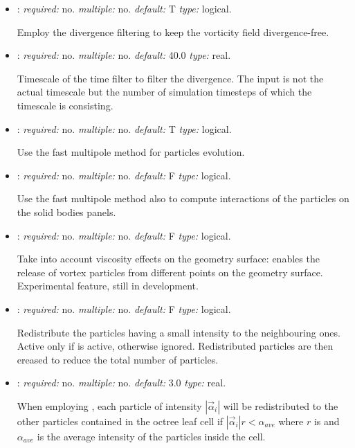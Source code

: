 \begin{itemize}
\item {}: \textit{required:} no. \textit{multiple:} no. \textit{default:} T \textit{type:} logical.

Employ the divergence filtering to keep the vorticity field divergence-free. 

\item {}: \textit{required:} no. \textit{multiple:} no. \textit{default:} 40.0 \textit{type:} real.

Timescale of the time filter to filter the divergence. The input is not the actual timescale but the number of simulation timesteps of which the timescale is consisting. 

\item {}: \textit{required:} no. \textit{multiple:} no. \textit{default:} T \textit{type:} logical.

Use the fast multipole method for particles evolution.

\item {}: \textit{required:} no. \textit{multiple:} no. \textit{default:} F \textit{type:} logical.

Use the fast multipole method also to compute interactions of the particles on the solid bodies panels.

\item {}: \textit{required:} no. \textit{multiple:} no. \textit{default:} F \textit{type:} logical.

Take into account viscosity effects on the geometry surface: enables the release of vortex particles from different points on the geometry surface. Experimental feature, still in development.

\item {}: \textit{required:} no. \textit{multiple:} no. \textit{default:} F \textit{type:} logical.

Redistribute the particles having a small intensity to the neighbouring ones. Active only if  is active, otherwise ignored. Redistributed particles are then ereased to reduce the total number of particles.

\item {}: \textit{required:} no. \textit{multiple:} no. \textit{default:} 3.0 \textit{type:} real.

When employing , each particle of intensity $|\vec{\alpha}_i|$ will be redistributed to the other particles contained in the octree leaf cell if $|\vec{\alpha}_i| r < \alpha_{ave}$ where $r$ is  and $\alpha_{ave}$ is the average intensity of the particles inside the cell.


\end{itemize}
